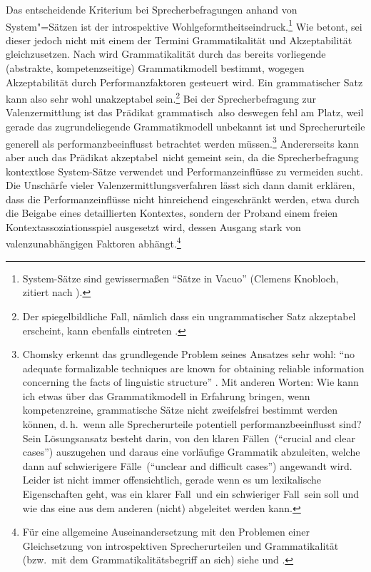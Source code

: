 \newpage
Das entscheidende Kriterium bei Sprecherbefragungen anhand von System"=Sätzen ist der introspektive Wohlgeformtheitseindruck.\footnote{System-Sätze sind gewisserma\ss en "`Sätze in Vacuo"' (Clemens Knobloch, zitiert nach \citealt[12]{Ortner:87}).} Wie \cite{Storrer:92} betont, sei dieser jedoch nicht mit einem der Termini Grammatikalität und Akzeptabilität gleichzusetzen. Nach \cite{Chomsky:65} wird Grammatikalität durch das bereits vorliegende (abstrakte, kompetenzseitige) Grammatikmodell bestimmt, wogegen Akzeptabilität durch Performanzfaktoren gesteuert wird. Ein grammatischer Satz kann also sehr wohl unakzeptabel sein.\footnote{Der spiegelbildliche Fall, nämlich dass ein ungrammatischer Satz akzeptabel erscheint, kann ebenfalls eintreten \citep{Frazier:85,Gibson:Thomas:99}.} Bei der Sprecherbefragung zur Valenzermittlung ist das Prädikat \glq grammatisch\grq\ also deswegen fehl am Platz, weil gerade das zugrundeliegende Grammatikmodell unbekannt ist und Sprecherurteile generell als performanzbeeinflusst betrachtet werden müssen.\footnote{Chomsky erkennt das grundlegende Problem seines Ansatzes sehr wohl: "`no adequate formalizable techniques are known for obtaining reliable information concerning the facts of linguistic structure"' \citep[19]{Chomsky:65}. Mit anderen Worten: Wie kann ich etwas über das Grammatikmodell in Erfahrung bringen, wenn kompetenzreine, grammatische Sätze nicht zweifelsfrei bestimmt werden können, d.\,h.\ wenn alle Sprecherurteile potentiell performanzbeeinflusst sind? Sein Lösungsansatz besteht darin, von den \glqq klaren Fällen\grqq\ ("`crucial and clear cases"') auszugehen und daraus eine vorläufige Grammatik abzuleiten, welche dann auf \glqq schwierigere Fälle\grqq\ ("`unclear and difficult cases"') angewandt wird. Leider ist nicht immer offensichtlich, gerade wenn es um lexikalische Eigenschaften geht, was ein \glqq klarer Fall\grqq\ und ein \glqq schwieriger Fall\grqq\ sein soll und wie das eine aus dem anderen (nicht) abgeleitet werden kann.} Andererseits kann aber auch das Prädikat \glq akzeptabel\grq\ nicht gemeint sein, da die Sprecherbefragung kontextlose System-Sät\-ze verwendet und Performanzeinflüsse zu vermeiden sucht. Die Unschärfe vieler Valenzermittlungsverfahren lässt sich dann damit erklären, dass die Performanzeinflüsse nicht hinreichend eingeschränkt werden, etwa durch die Beigabe eines detaillierten Kontextes, sondern der Proband einem freien Kontextassoziationsspiel ausgesetzt wird, dessen Ausgang stark von valenzunabhängigen Faktoren abhängt.\footnote{Für eine allgemeine Auseinandersetzung mit den Problemen einer Gleichsetzung von introspektiven Sprecherurteilen und Grammatikalität (bzw.\ mit dem Grammatikalitätsbegriff an sich) siehe \cite{Schuetze:96} und \cite{Sampson:07}.}

